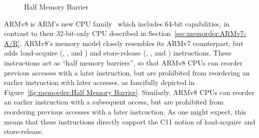 \begin{figure}[tb]
\centering
{}
\caption{Half Memory Barrier}
\end{figure}

ARMv8 is ARM's new CPU family~\cite{ARMv8A:2017}
which includes 64-bit capabilities,
in contrast to their 32-bit-only CPU described in
Section~\ref{sec:memorder:ARMv7-A/R}.
ARMv8's memory model closely resembles its ARMv7 counterpart,
but adds load-acquire (, , and )
and store-release (, , and )
instructions.
These instructions act as ``half memory barriers'', so that
ARMv8 CPUs can reorder previous accesses with a later 
instruction, but are prohibited from reordering an earlier 
instruction with later accesses, as fancifully depicted in
Figure~\ref{fig:memorder:Half Memory Barrier}.
Similarly, ARMv8 CPUs can reorder an earlier  instruction with
a subsequent access, but are prohibited from reordering
previous accesses with a later  instruction.
As one might expect, this means that these instructions directly support
the C11 notion of load-acquire and store-release.

